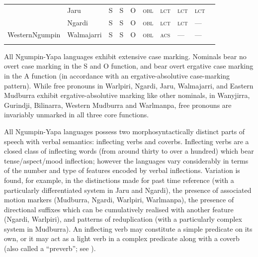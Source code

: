 \documentclass[output=paper,colorlinks,citecolor=brown]{langscibook}
\begin{document}
\begin{table}
\begin{tabularx}{\textwidth}{lX ll @{\quad} llllll}
\tablevspace

 & Jaru & \cellcolor[HTML]{8D8D8D}S & \cellcolor[HTML]{8D8D8D}S & \cellcolor[HTML]{9B9B9B}O & \cellcolor[HTML]{C0C0C0}\textsc{obl} & \cellcolor[HTML]{D9D6D6}\textsc{lct} & \cellcolor[HTML]{D9D6D6}\textsc{lct} & \cellcolor[HTML]{D9D6D6}\textsc{lct} &  \\
 & Ngardi & \cellcolor[HTML]{8D8D8D}S & \cellcolor[HTML]{8D8D8D}S & \cellcolor[HTML]{9B9B9B}O & \cellcolor[HTML]{C0C0C0}\textsc{obl} & \cellcolor[HTML]{D9D6D6}\textsc{lct} & \cellcolor[HTML]{D9D6D6}\textsc{lct} & --- &  \\
\multirow{-3}{15mm}{Western\newline Ngumpin  } & Walmajarri & \cellcolor[HTML]{8D8D8D}S & \cellcolor[HTML]{8D8D8D}S & \cellcolor[HTML]{9B9B9B}O & \cellcolor[HTML]{C0C0C0}\textsc{obl} & \cellcolor[HTML]{D9D6D6}\textsc{acs} & --- & --- &  \\
\lspbottomrule
\end{tabularx}
\end{table}

All Ngumpin-Yapa languages exhibit extensive case marking. Nominals bear no overt case marking in the S and O function, and bear overt ergative case marking in the A function (in accordance with an ergative-absolutive case-marking pattern). While free pronouns in Warlpiri, Ngardi, Jaru, Walmajarri, and Eastern Mudburra exhibit ergative-absolutive marking like other nominals, in Wanyjirra, Gurindji, Bilinarra, Western Mudburra and Warlmanpa, free pronouns are invariably unmarked in all three core functions.

All Ngumpin-Yapa languages possess two morphosyntactically distinct parts of speech with verbal semantics: inflecting verbs and coverbs. Inflecting verbs are a closed class of inflecting words (from around thirty to over a hundred) which bear tense/aspect/mood inflection; however the languages vary considerably in terms of the number and type of features encoded by verbal inflections. Variation is found, for example, in the distinctions made for past time reference (with a particularly differentiated system in Jaru and Ngardi), the presence of associated motion markers (Mudburra, Ngardi, Warlpiri, Warlmanpa), the presence of directional suffixes which can be cumulatively realised with another feature (Ngardi, Warlpiri), and patterns of reduplication (with a particularly complex system in Mudburra). An inflecting verb may constitute a simple predicate on its own, or it may act as a light verb in a complex predicate along with a coverb (also called a ``preverb''; see \citealt{Osgarby_complexpred}).
\end{document}
